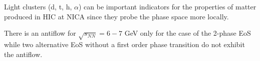 \documentclass[dvipsnames] {beamer}
\begin{document}
\begin{frame}
\begin{columns}[c]
    \begin{block}{}
      \bf
      \begin{itemize}
      \item Light clusters (d, t, h, $\alpha$) can be important indicators for
        the properties of matter produced in HIC at NICA since they probe the
        phase space more locally.

        {\color{red} \item There is an antiflow for $\sqrt{s_{NN}} = 6-7$ GeV only
          for the case of the 2-phase
          EoS while two alternative EoS without a first order phase
          transition do not exhibit the antiflow.}
      \end{itemize}
    \end{block}


  \end{columns}
\end{frame}
\end{document}
